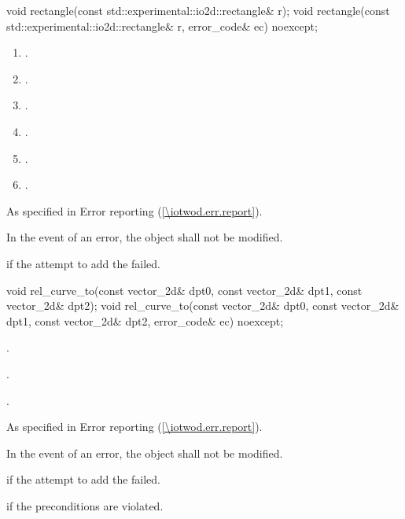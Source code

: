 \begin{itemdecl}
    void rectangle(const std::experimental::io2d::rectangle& r);
    void rectangle(const std::experimental::io2d::rectangle& r,
      error_code& ec) noexcept;
\end{itemdecl}
\begin{itemdescr}
	\pnum
	\effects
	\begin{enumerate}
	\item {}.

	\item {}.
	
	\item {}.
	
	\item {}.
	
	\item {}.
	
	\item {}.
	\end{enumerate}
	
	\pnum
	\throws
	As specified in Error reporting (\ref{\iotwod.err.report}).

	\pnum
	\remarks
	In the event of an error, the object shall not be modified.

	\pnum
	\errors
	 if the attempt to add the  failed.
	
\end{itemdescr}

\begin{itemdecl}
    void rel_curve_to(const vector_2d& dpt0, const vector_2d& dpt1,
      const vector_2d& dpt2);
    void rel_curve_to(const vector_2d& dpt0, const vector_2d& dpt1,
      const vector_2d& dpt2, error_code& ec) noexcept;
\end{itemdecl}
\begin{itemdescr}
	\pnum
	\preconditions
	.

	\pnum
	\effects
	.
	
	\pnum
	.
	
	\pnum
	\throws
	As specified in Error reporting (\ref{\iotwod.err.report}).

	\pnum
	\remarks
	In the event of an error, the object shall not be modified.

	\pnum
	\errors
	 if the attempt to add the  failed.
	
	\pnum
	 if the preconditions are violated.
	
\end{itemdescr}

